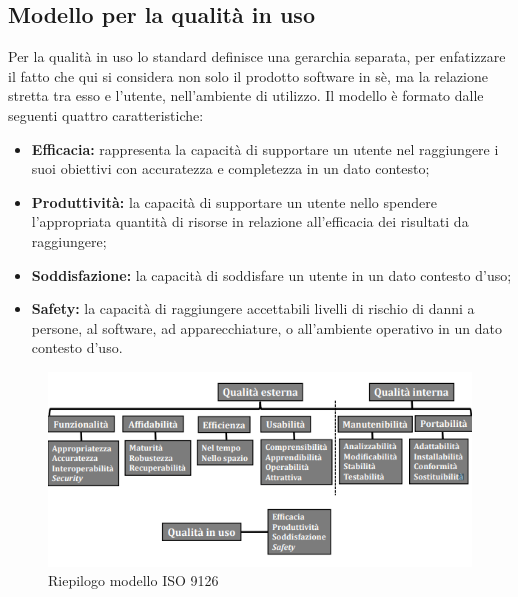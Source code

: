 \subsection{Modello per la qualità in uso}
Per la qualità in uso lo standard definisce una gerarchia separata, per enfatizzare il fatto che qui si considera non solo il prodotto software in sè, ma la relazione stretta tra esso e l'utente, nell'ambiente di utilizzo. Il modello è formato dalle seguenti quattro caratteristiche:
\begin{itemize}
	\item \textbf{Efficacia:} rappresenta la capacità di supportare un utente nel raggiungere i suoi obiettivi con accuratezza e completezza in un dato contesto;
	\item \textbf{Produttività:} la capacità di supportare un utente nello spendere l’appropriata quantità di risorse in relazione all’efficacia dei risultati da raggiungere; 
	\item \textbf{Soddisfazione:} la capacità di soddisfare un utente in un dato contesto d’uso;
	\item \textbf{Safety:} la capacità di raggiungere accettabili livelli di rischio di
	danni a persone, al software, ad apparecchiature, o all’ambiente operativo in un dato contesto d’uso.
\end{itemize}
\begin{figure}[htbp]
	\centering
	\includegraphics{images/gerarchiaQualitaProdotto.png}
	\caption{Riepilogo modello ISO 9126}
\end{figure}